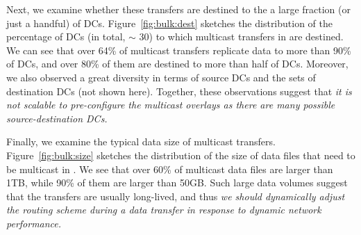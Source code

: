 Next, we examine whether these transfers are destined to the
a large fraction (or just a handful) of DCs.
Figure~\ref{fig:bulk:dest} sketches the distribution of the
percentage of DCs (in total, $\sim$ 30) to which multicast
transfers in \company are destined.
We can see that over 64\% of multicast transfers replicate data
to more than 90\% of DCs, and over 80\% of them are destined
to more than half of DCs.
Moreover, we also observed a great diversity  in terms of
source DCs and the sets of destination DCs (not shown here).
Together, these observations suggest that {\em it is not
scalable to pre-configure the multicast overlays as there
are many possible source-destination DCs.}


Finally, we examine the typical data size of multicast transfers.
Figure~\ref{fig:bulk:size} sketches the distribution of the
size of data files that need to be multicast in \company.
We see that over 60\% of multicast data files are larger than 1TB,
while 90\% of them are larger than 50GB.
Such large data volumes suggest that the transfers are usually
long-lived, and thus {\em we should dynamically adjust
the routing scheme during a data transfer in response to
dynamic network performance.}


